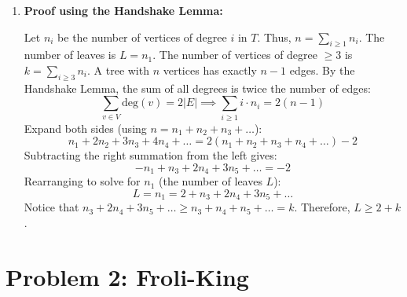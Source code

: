 \documentclass[11pt]{article}
\begin{document}
\begin{enumerate}[label=\textbf{(\alph*)}]
    \item \textbf{Proof using the Handshake Lemma:}
    
    Let $n_i$ be the number of vertices of degree $i$ in $T$. Thus, $n = \sum_{i \ge 1} n_i$. The number of leaves is $L = n_1$. The number of vertices of degree $\ge 3$ is $k = \sum_{i \ge 3} n_i$.
    A tree with $n$ vertices has exactly $n - 1$ edges. By the Handshake Lemma, the sum of all degrees is twice the number of edges:
    $$\sum_{v \in V} \text{deg}(v) = 2|E| \implies \sum_{i \ge 1} i \cdot n_i = 2(n - 1)$$
    Expand both sides (using $n = n_1 + n_2 + n_3 + \dots$):
    $$n_1 + 2n_2 + 3n_3 + 4n_4 + \dots = 2(n_1 + n_2 + n_3 + n_4 + \dots) - 2$$
    Subtracting the right summation from the left gives:
    $$-n_1 + n_3 + 2n_4 + 3n_5 + \dots = -2$$
    Rearranging to solve for $n_1$ (the number of leaves $L$):
    $$L = n_1 = 2 + n_3 + 2n_4 + 3n_5 + \dots$$
    Notice that $n_3 + 2n_4 + 3n_5 + \dots \ge n_3 + n_4 + n_5 + \dots = k$. 
    Therefore, $L \ge 2 + k$.
\end{enumerate}

\vspace{0.5cm}

\section*{Problem 2: Froli-King}
\end{document}
